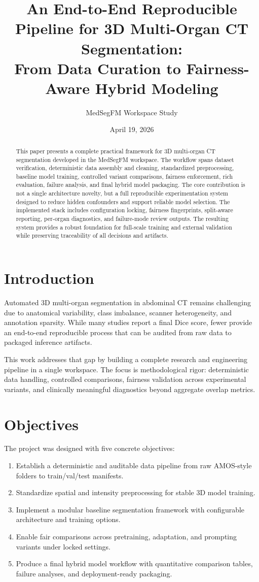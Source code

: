 \documentclass[11pt,a4paper]{article}
\title{An End-to-End Reproducible Pipeline for 3D Multi-Organ CT Segmentation:\\From Data Curation to Fairness-Aware Hybrid Modeling}
\author{MedSegFM Workspace Study}
\date{April 19, 2026}
\begin{document}
\maketitle
\begin{abstract}
This paper presents a complete practical framework for 3D multi-organ CT segmentation developed in the MedSegFM workspace. The workflow spans dataset verification, deterministic data assembly and cleaning, standardized preprocessing, baseline model training, controlled variant comparisons, fairness enforcement, rich evaluation, failure analysis, and final hybrid model packaging. The core contribution is not a single architecture novelty, but a full reproducible experimentation system designed to reduce hidden confounders and support reliable model selection. The implemented stack includes configuration locking, fairness fingerprints, split-aware reporting, per-organ diagnostics, and failure-mode review outputs. The resulting system provides a robust foundation for full-scale training and external validation while preserving traceability of all decisions and artifacts.
\end{abstract}

\section{Introduction}
Automated 3D multi-organ segmentation in abdominal CT remains challenging due to anatomical variability, class imbalance, scanner heterogeneity, and annotation sparsity. While many studies report a final Dice score, fewer provide an end-to-end reproducible process that can be audited from raw data to packaged inference artifacts.

This work addresses that gap by building a complete research and engineering pipeline in a single workspace. The focus is methodological rigor: deterministic data handling, controlled comparisons, fairness validation across experimental variants, and clinically meaningful diagnostics beyond aggregate overlap metrics.

\section{Objectives}
The project was designed with five concrete objectives:
\begin{enumerate}
\item Establish a deterministic and auditable data pipeline from raw AMOS-style folders to train/val/test manifests.
\item Standardize spatial and intensity preprocessing for stable 3D model training.
\item Implement a modular baseline segmentation framework with configurable architecture and training options.
\item Enable fair comparisons across pretraining, adaptation, and prompting variants under locked settings.
\item Produce a final hybrid model workflow with quantitative comparison tables, failure analyses, and deployment-ready packaging.
\end{enumerate}
\end{document}

